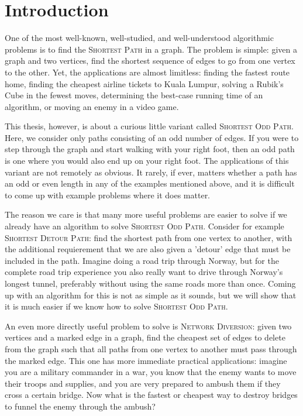 \chapter{Introduction}

One of the most well-known, well-studied, and well-understood algorithmic problems is to find the \textsc{Shortest Path} in a graph. The problem is simple: given a graph and two vertices, find the shortest sequence of edges to go from one vertex to the other. Yet, the applications are almost limitless: finding the fastest route home, finding the cheapest airline tickets to Kuala Lumpur, solving a Rubik's Cube in the fewest moves, determining the best-case running time of an algorithm, or moving an enemy in a video game.

This thesis, however, is about a curious little variant called \textsc{Shortest Odd Path}. Here, we consider only paths consisting of an odd number of edges. If you were to step through the graph and start walking with your right foot, then an odd path is one where you would also end up on your right foot. The applications of this variant are not remotely as obvious. It rarely, if ever, matters whether a path has an odd or even length in any of the examples mentioned above, and it is difficult to come up with example problems where it does matter.

The reason we care is that many more useful problems are easier to solve if we already have an algorithm to solve \textsc{Shortest Odd Path}. Consider for example \textsc{Shortest Detour Path}: find the shortest path from one vertex to another, with the additional requierement that we are also given a 'detour' edge that must be included in the path. Imagine doing a road trip through Norway, but for the complete road trip experience you also really want to drive through Norway's longest tunnel, preferably without using the same roads more than once. Coming up with an algorithm for this is not as simple as it sounds, but we will show that it is much easier if we know how to solve \textsc{Shortest Odd Path}.

An even more directly useful problem to solve is \textsc{Network Diversion}: given two vertices and a marked edge in a graph, find the cheapest set of edges to delete from the graph such that all paths from one vertex to another must pass through the marked edge. This one has more immediate practical applications: imagine you are a military commander in a war, you know that the enemy wants to move their troops and supplies, and you are very prepared to ambush them if they cross a certain bridge. Now what is the fastest or cheapest way to destroy bridges to funnel the enemy through the ambush?

